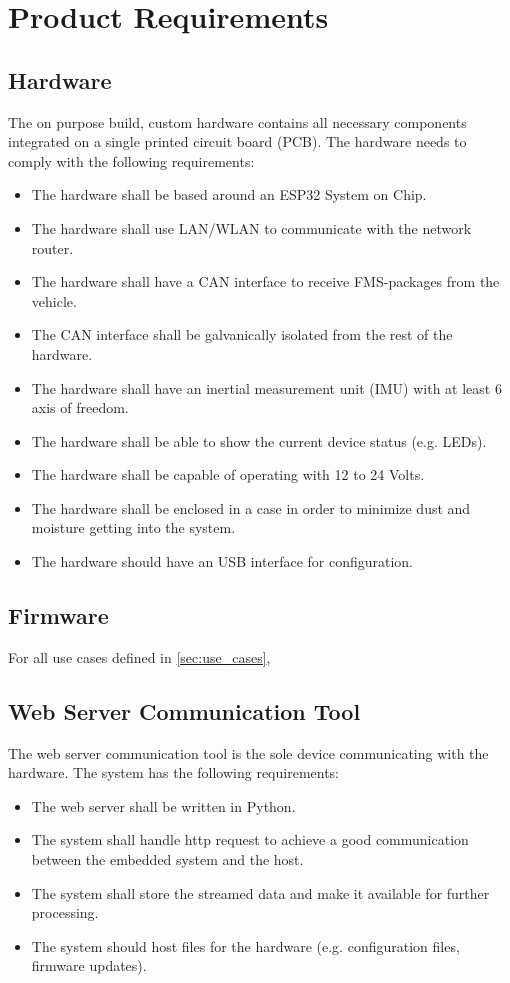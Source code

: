 \newpage
\section{Product Requirements}

\subsection{Hardware}
The on purpose build, custom hardware contains all necessary components integrated on a single printed circuit board (PCB). The hardware needs to comply with the following requirements: 
\begin{itemize}
		\item The hardware shall be based around an ESP32 System on Chip.
		\item The hardware shall use LAN/WLAN to communicate with the network router.
		\item The hardware shall have a CAN interface to receive FMS-packages from the vehicle.
		\item The CAN interface shall be galvanically isolated from the rest of the hardware.
		\item The hardware shall have an inertial measurement unit (IMU) with at least 6 axis of freedom.
		\item The hardware shall be able to show the current device status (e.g. LEDs).
		\item The hardware shall be capable of operating with 12 to 24 Volts.
		\item The hardware shall be enclosed in a case in order to minimize dust and moisture getting into the system.
		\item The hardware should have an USB interface for configuration.
\end{itemize}

\subsection{Firmware}
For all use cases defined in \cref{sec:use_cases}, 

\subsection{Web Server Communication Tool}
The web server communication tool is the sole device communicating with the hardware. The system has the following requirements:
\begin{itemize}
        \item The web server shall be written in Python.
        \item The system shall handle http request to achieve a good communication between the embedded system and the host.
        \item The system shall store the streamed data and make it available for further processing.
        \item The system should host files for the hardware (e.g. configuration files, firmware updates).
\end{itemize}

